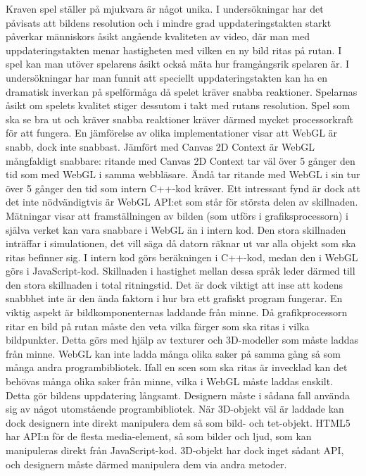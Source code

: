 Kraven spel ställer på mjukvara är något unika. I undersökningar har det påvisats att bildens resolution och i mindre grad uppdateringstakten starkt påverkar människors åsikt angående kvaliteten av video, där man med uppdateringstakten menar hastigheten med vilken en ny bild ritas på rutan. I spel kan man utöver spelarens åsikt också mäta hur framgångsrik spelaren är. I undersökningar har man funnit att speciellt uppdateringstakten kan ha en dramatisk inverkan på spelförmåga då spelet kräver snabba reaktioner. Spelarnas åsikt om spelets kvalitet stiger dessutom i takt med rutans resolution. Spel som ska se bra ut och kräver snabba reaktioner kräver därmed mycket processorkraft för att fungera.
En jämförelse av olika implementationer visar att WebGL är snabb, dock inte snabbast. Jämfört med Canvas 2D Context är WebGL mångfaldigt snabbare: ritande med Canvas 2D Context tar väl över 5 gånger den tid som med WebGL i samma webbläsare. Ändå tar ritande med WebGL  i sin tur över 5 gånger den tid som intern C++-kod kräver.
Ett intressant fynd är dock att det inte nödvändigtvis är WebGL API:et som står för största delen av skillnaden. Mätningar visar att framställningen av bilden (som utförs i grafiksprocessorn) i själva verket kan vara snabbare i WebGL än i intern kod. Den stora skillnaden inträffar i simulationen, det vill säga då datorn räknar ut var alla objekt som ska ritas befinner sig. I intern kod görs beräkningen i C++-kod, medan den i WebGL görs i JavaScript-kod. Skillnaden i hastighet mellan dessa språk leder därmed till den stora skillnaden i total ritningstid.
Det är dock viktigt att inse att kodens snabbhet inte är den ända faktorn i hur bra ett grafiskt program fungerar. En viktig aspekt är bildkomponenternas laddande från minne. Då grafikprocessorn ritar en bild på rutan måste den veta vilka färger som ska ritas i vilka bildpunkter. Detta görs med hjälp av texturer och 3D-modeller som måste laddas från minne. WebGL kan inte ladda många olika saker på samma gång så som många andra programbibliotek. Ifall en scen som ska ritas är invecklad kan det behövas många olika saker från minne, vilka i WebGL måste laddas enskilt. Detta gör bildens uppdatering långsamt. Designern måste i sådana fall använda sig av något utomstående programbibliotek.
När 3D-objekt väl är laddade kan dock designern inte direkt manipulera dem så som bild- och tet-objekt. HTML5 har API:n för de flesta media-element, så som bilder och ljud, som kan manipuleras direkt från JavaScript-kod. 3D-objekt har dock inget sådant API, och designern måste därmed manipulera dem via andra metoder.
